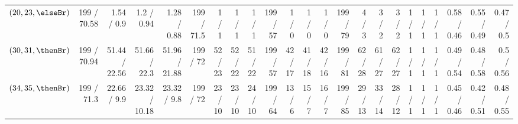 \begin{table*}
{\begin{tabular}{l|rrrr|rrrr|rrrr|rrrr|r|r|r|r|r|r}
    $(20,23,\elseBr)$    & 199    / 70.58   & 1.54   / 0.9   & 1.2    / 0.94  & 1.28   / 0.88  & 199  / 71.5 & 1   / 1  & 1   / 1     & 1   / 1    & 199  / 57  & 1   / 0   & 1   / 0  & 1   / 0   & 199  / 79  & 4   / 3   & 3   / 2   & 3   / 2   & 1 / 1 & 1 / 1 & 1 / 1 & 0.58 / 0.46 & 0.55 / 0.49 & 0.47 / 0.5 \\
    $(30,31,\thenBr)$    & 199    / 70.94   & 51.44  / 22.56 & 51.66  / 22.3  & 51.96  / 21.88 & 199  / 72   & 52  / 23 & 52  / 22    & 51  / 22   & 199  / 57  & 42  / 17  & 41  / 18 & 42  / 16  & 199  / 81  & 62  / 28  & 61  / 27  & 62  / 27  & 1 / 1 & 1 / 1 & 1 / 1 & 0.49 / 0.54 & 0.48 / 0.58 & 0.5 / 0.56 \\
    $(34,35,\thenBr)$    & 199    / 71.3    & 22.66  / 9.9   & 23.32  / 10.18 & 23.32  / 9.8   & 199  / 72   & 23  / 10 & 23  / 10    & 24  / 10   & 199  / 64  & 13  / 6   & 15  / 7  & 16  / 7   & 199  / 85  & 29  / 13  & 33  / 14  & 28  / 12  & 1 / 1 & 1 / 1 & 1 / 1 & 0.45 / 0.46 & 0.42 / 0.51 & 0.48 / 0.55 \\
    \bottomrule
    \end{tabular}
}
\end{table*}
